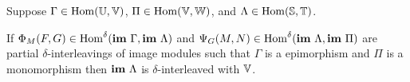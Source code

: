 \begin{lemma}\label{thm:interleaving_main}
  Suppose $\Gamma\in\mathrm{Hom}(\mathbb{U},\mathbb{V})$, $\Pi\in\mathrm{Hom}(\mathbb{V},\mathbb{W})$, and $\Lambda\in\mathrm{Hom}(\mathbb{S}, \mathbb{T})$.

  If $\Phi_M(F, G)\in\mathrm{Hom}^\delta(\mathbf{im}~\Gamma, \mathbf{im}~\Lambda)$ and $\Psi_G(M, N)\in\mathrm{Hom}^\delta(\mathbf{im}~\Lambda, \mathbf{im}~\Pi)$ are partial $\delta$-interleavings of image modules such that $\Gamma$ is a epimorphism and $\Pi$ is a monomorphism then $\mathbf{im}~\Lambda$ is $\delta$-interleaved with $\mathbb{V}$.
\end{lemma}
%
%
%

